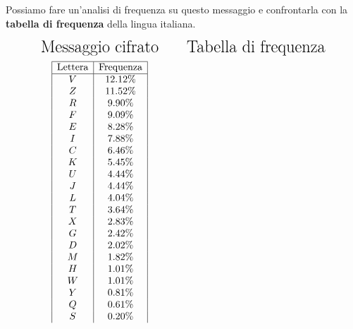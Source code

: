 \documentclass{rapport}
\begin{document}
Possiamo fare un'analisi di frequenza su questo messaggio e confrontarla con la \textbf{tabella di frequenza} della lingua italiana.


\[
\begin{array}{c@{\hskip 1cm}c} %

\text{\LARGE Messaggio cifrato} & \text{\LARGE Tabella di frequenza} \\ [0.2cm]

\begin{array}{|c|c|}
\hline
\text{Lettera} & \text{Frequenza} \\ \hline
V & 12.12\%  \\ 
 Z & 11.52\%  \\ 
 R & 9.90\%  \\ 
 F & 9.09\%  \\ 
 E & 8.28\%  \\ 
 I & 7.88\%  \\ 
 C & 6.46\%  \\ 
 K & 5.45\%  \\ 
 U & 4.44\%  \\ 
 J & 4.44\%  \\ 
 L & 4.04\%  \\ 
 T & 3.64\%  \\ 
 X & 2.83\%  \\ 
 G & 2.42\%  \\ 
 D & 2.02\%  \\ 
 M & 1.82\%  \\ 
 H & 1.01\%  \\ 
 W & 1.01\%  \\ 
 Y & 0.81\%  \\ 
 Q & 0.61\%  \\ 
 S & 0.20\%  \\ 
 

\end{array}
\end{array}\]
\end{document}
